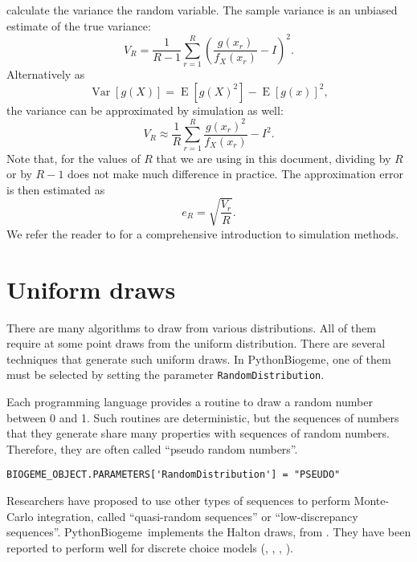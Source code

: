 \documentclass[12pt,a4paper]{article}
\newcommand{\expect}{\operatorname{E}}
\newcommand{\var}{\operatorname{Var}}
\newcommand{\PBIOGEME}{PythonBiogeme}
\begin{document}
calculate the variance the random variable.
The sample variance is an unbiased estimate of the true variance:
\begin{equation}
V_R = \frac{1}{R-1} \sum_{r=1}^R (\frac{g(x_r)}{f_X(x_r)} - I)^2.
\end{equation}
Alternatively as 
\begin{equation}
\var[g(X)] = \expect[g(X)^2] - \expect[g(x)]^2,
\end{equation}
the variance can be approximated by simulation as well:
\begin{equation}
\label{eq:simulatedVariance}
V_R \approx \frac{1}{R} \sum_{r=1}^R \frac{g(x_r)^2}{f_X(x_r)} -
I^2.
\end{equation}
Note that, for the values of $R$ that we are using in this document,
dividing by $R$ or by $R-1$ does not make much difference in practice. The approximation error is then estimated as
\begin{equation}
\label{eq:stderr}
e_R = \sqrt{\frac{V_r}{R}}.
\end{equation}
We refer the reader to  for a comprehensive
introduction to simulation methods. 

\section{Uniform draws}
\label{sec:uniform}
There are many algorithms  to draw from various
distributions. All of them require at some point draws from the
uniform distribution. There are several techniques that generate such
uniform draws.  In \PBIOGEME, one of them must be selected by setting the
parameter \lstinline$RandomDistribution$.

Each programming language provides a routine to
draw a random number between 0 and 1. Such routines are
deterministic, but the sequences of numbers that they generate share
many properties with sequences of random numbers. Therefore, they are
often called ``pseudo random numbers''.

\begin{lstlisting}
BIOGEME_OBJECT.PARAMETERS['RandomDistribution'] = "PSEUDO"
\end{lstlisting}


Researchers have proposed to use other types of sequences to perform
Monte-Carlo integration, called ``quasi-random sequences'' or
``low-discrepancy sequences''. \PBIOGEME\ implements the Halton draws,
from .  They have been reported to perform well for
discrete choice models (\cite{Trai2000}, \cite{Bhat2001},
\cite{Bhat2003837}, \cite{Sandor2004313}). 
\end{document}
